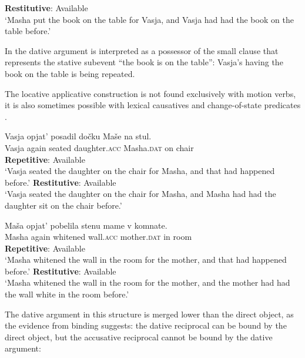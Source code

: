 \documentclass[output=paper]{langscibook}
\begin{document}
\newpage 
\ex \textbf{Restitutive}: Available\\
`Masha put the book on the table for Vasja, and Vasja had had   the book on the table before.'
\z\z


\noindent In  the dative argument is interpreted as a possessor of the small clause that represents the stative subevent “the book is on the table”: Vasja’s having the book on the table is being repeated.



The locative applicative construction is not found exclusively with motion verbs, it is also sometimes possible with lexical causatives  and change-of-state predicates .


 \ea\label{ex:bondarenko:37}
\gll Vasja opjat’ posadil dočku Maše na stul.\\
     Vasja again seated daughter.\textsc{acc} Masha.\textsc{dat} on chair\\
\ea \textbf{Repetitive}: Available\\
`Vasja seated the daughter on the chair for Masha, and that had   happened before.'
\ex \textbf{Restitutive}: Available\\
`Vasja seated the daughter on the chair for Masha, and Masha   had had the daughter sit on the chair before.'
\z\z

 \ea\label{ex:bondarenko:38}
\gll Maša opjat’ pobelila stenu mame v komnate.\\
     Masha again whitened wall.\textsc{acc} mother.\textsc{dat} in room\\
\ea \textbf{Repetitive}: Available\\
`Masha whitened the wall in the room for the mother, and that   had happened before.'
\ex \textbf{Restitutive}: Available\\
`Masha whitened the wall in the room for the mother, and the   mother had had the wall white in the room before.'
\z\z


\noindent The dative argument in this structure is merged lower than the direct object, as the evidence from binding suggests: the dative reciprocal can be bound by the direct object, but the accusative reciprocal cannot be bound by the dative argument:


 \ea\label{ex:bondarenko:39}
 \label{ex:bondarenko:40}
\z\z
\end{document}
